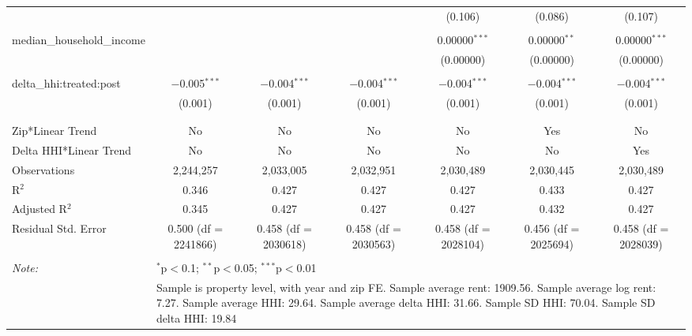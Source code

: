 \begin{table}[H]
{\begin{tabular}{@{\extracolsep{5pt}}lcccccc}
   &  &  &  & (0.106) & (0.086) & (0.107) \\  

   & & & & & & \\  

  median\_household\_income &  &  &  & 0.00000$^{***}$ & 0.00000$^{**}$ & 0.00000$^{***}$ \\  

   &  &  &  & (0.00000) & (0.00000) & (0.00000) \\  

   & & & & & & \\  

  delta\_hhi:treated:post & $-$0.005$^{***}$ & $-$0.004$^{***}$ & $-$0.004$^{***}$ & $-$0.004$^{***}$ & $-$0.004$^{***}$ & $-$0.004$^{***}$ \\  

   & (0.001) & (0.001) & (0.001) & (0.001) & (0.001) & (0.001) \\  

   & & & & & & \\  

 \hline \\[-1.8ex]  

 Zip*Linear Trend & No & No & No & No & Yes & No \\  

 Delta HHI*Linear Trend & No & No & No & No & No & Yes \\  

 Observations & 2,244,257 & 2,033,005 & 2,032,951 & 2,030,489 & 2,030,445 & 2,030,489 \\  

 R$^{2}$ & 0.346 & 0.427 & 0.427 & 0.427 & 0.433 & 0.427 \\  

 Adjusted R$^{2}$ & 0.345 & 0.427 & 0.427 & 0.427 & 0.432 & 0.427 \\  

 Residual Std. Error & 0.500 (df = 2241866) & 0.458 (df = 2030618) & 0.458 (df = 2030563) & 0.458 (df = 2028104) & 0.456 (df = 2025694) & 0.458 (df = 2028039) \\  

 \hline  

 \hline \\[-1.8ex]  

 \textit{Note:}  & \multicolumn{6}{l}{$^{*}$p$<$0.1; $^{**}$p$<$0.05; $^{***}$p$<$0.01} \\  

  & \multicolumn{6}{l}{Sample is property level, with year and zip FE. Sample average rent: 1909.56. Sample average log rent: 7.27. Sample average HHI: 29.64. Sample average delta HHI: 31.66. Sample SD HHI: 70.04. Sample SD delta HHI: 19.84} \\  

 \end{tabular}}  

 \end{table}  


